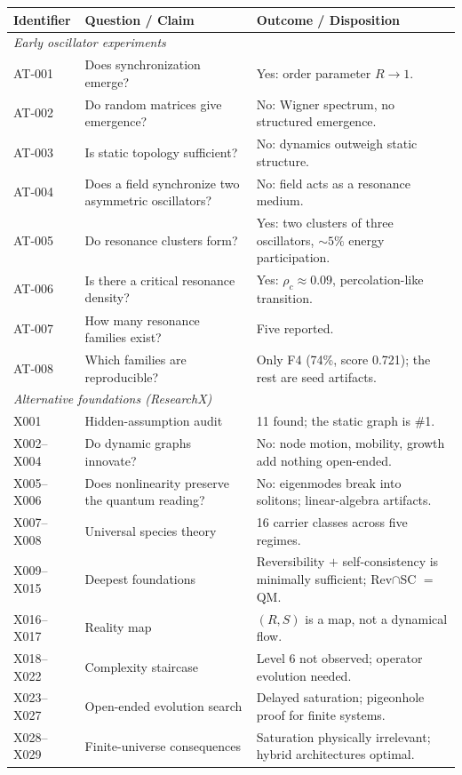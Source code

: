 \documentclass[10pt,twoside,openany]{book}
\begin{document}
\begin{longtable}{p{4.2cm}p{5.2cm}p{5.6cm}}
\toprule
Identifier & Question / Claim & Outcome / Disposition \\
\midrule
\endhead
\multicolumn{3}{l}{\emph{Early oscillator experiments}} \\
\midrule
AT-001 & Does synchronization emerge? & Yes: order parameter $R\to1$. \\
AT-002 & Do random matrices give emergence? & No: Wigner spectrum, no structured emergence. \\
AT-003 & Is static topology sufficient? & No: dynamics outweigh static structure. \\
AT-004 & Does a field synchronize two asymmetric oscillators? & No: field acts as a resonance medium. \\
AT-005 & Do resonance clusters form? & Yes: two clusters of three oscillators, $\sim5\%$ energy participation. \\
AT-006 & Is there a critical resonance density? & Yes: $\rho_c\approx0.09$, percolation-like transition. \\
AT-007 & How many resonance families exist? & Five reported. \\
AT-008 & Which families are reproducible? & Only F4 (74\%, score 0.721); the rest are seed artifacts. \\
\midrule
\multicolumn{3}{l}{\emph{Alternative foundations (ResearchX)}} \\
\midrule
X001 & Hidden-assumption audit & 11 found; the static graph is \#1. \\
X002--X004 & Do dynamic graphs innovate? & No: node motion, mobility, growth add nothing open-ended. \\
X005--X006 & Does nonlinearity preserve the quantum reading? & No: eigenmodes break into solitons; linear-algebra artifacts. \\
X007--X008 & Universal species theory & 16 carrier classes across five regimes. \\
X009--X015 & Deepest foundations & Reversibility $+$ self-consistency is minimally sufficient; Rev$\cap$SC $=$ QM. \\
X016--X017 & Reality map & $(R,S)$ is a map, not a dynamical flow. \\
X018--X022 & Complexity staircase & Level 6 not observed; operator evolution needed. \\
X023--X027 & Open-ended evolution search & Delayed saturation; pigeonhole proof for finite systems. \\
X028--X029 & Finite-universe consequences & Saturation physically irrelevant; hybrid architectures optimal. \\

\end{longtable}
\end{document}
